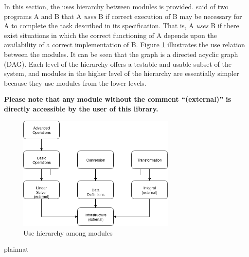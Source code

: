\documentclass[12pt, titlepage]{article}
\begin{document}
In this section, the uses hierarchy between modules is
provided. \cite{Parnas1978} said of two programs A and B that A {\em uses} B if
correct execution of B may be necessary for A to complete the task described in
its specification. That is, A {\em uses} B if there exist situations in which
the correct functioning of A depends upon the availability of a correct
implementation of B.  Figure \ref{FigUH} illustrates the use relation between
the modules. It can be seen that the graph is a directed acyclic graph
(DAG). Each level of the hierarchy offers a testable and usable subset of the
system, and modules in the higher level of the hierarchy are essentially simpler
because they use modules from the lower levels.

\textbf{Please note that any module without the comment ``(external)'' is directly accessible by the user of this library.}

\begin{figure}[H]
\centering
\includegraphics[width=0.7\textwidth]{UsesHierarchy.png}
\caption{Use hierarchy among modules}
\label{FigUH}
\end{figure}


\newpage
 {plainnat}

\end{document}
